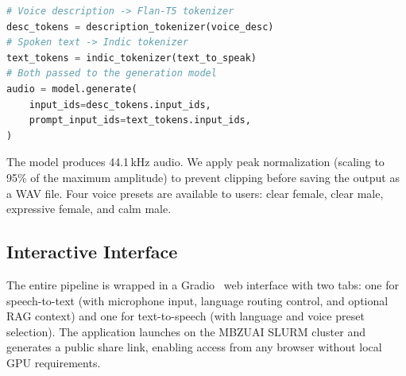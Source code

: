 \begin{lstlisting}[caption={Dual-tokenizer TTS integration (simplified).},label={lst:tts},language=Python,numbers=none]
# Voice description -> Flan-T5 tokenizer
desc_tokens = description_tokenizer(voice_desc)
# Spoken text -> Indic tokenizer
text_tokens = indic_tokenizer(text_to_speak)
# Both passed to the generation model
audio = model.generate(
    input_ids=desc_tokens.input_ids,
    prompt_input_ids=text_tokens.input_ids,
)
\end{lstlisting}

The model produces 44.1\,kHz audio. We apply peak normalization (scaling to 95\% of the maximum amplitude) to prevent clipping before saving the output as a WAV file. Four voice presets are available to users: clear female, clear male, expressive female, and calm male.

\subsection{Interactive Interface}
\label{sec:ui}

The entire pipeline is wrapped in a Gradio~\cite{gradio2023} web interface with two tabs: one for speech-to-text (with microphone input, language routing control, and optional RAG context) and one for text-to-speech (with language and voice preset selection). The application launches on the MBZUAI SLURM cluster and generates a public share link, enabling access from any browser without local GPU requirements.
